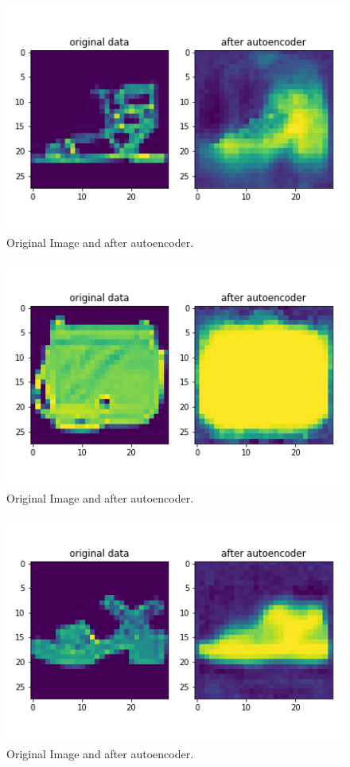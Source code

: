 \documentclass[11pt,a4paper,oneside]{article}
\begin{document}
\begin{figure}[!btp]
	\centering
	\includegraphics[width=\textwidth]{figures/save_ev_0}
	\caption{Original Image and after autoencoder.}
\end{figure}
\begin{figure}[!btp]
	\centering
	\includegraphics[width=\textwidth]{figures/save_ev_1}
	\caption{Original Image and after autoencoder.}
\end{figure}
\begin{figure}[!btp]
	\centering
	\includegraphics[width=\textwidth]{figures/save_ev_2}
	\caption{Original Image and after autoencoder.}
\end{figure}
\end{document}
